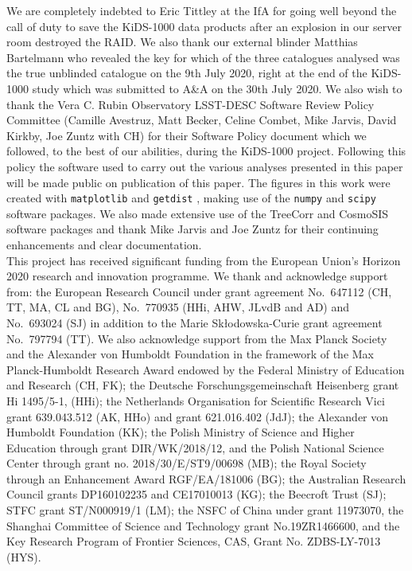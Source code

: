 \documentclass{aa}
\newcommand{\software}[1]{\texttt{#1}}
\begin{document}
\begin{acknowledgements}
We are completely indebted to Eric Tittley at the IfA for going well beyond the call of duty to save the KiDS-1000 data products after an explosion in our server room destroyed the RAID.   We also thank
our external blinder Matthias Bartelmann who revealed the key for which of the three catalogues analysed was the true unblinded catalogue on the 9th July 2020, right at the end of the KiDS-1000 study which was submitted to A\&A on the 30th July 2020.   We also wish to thank the Vera C. Rubin Observatory LSST-DESC Software Review Policy Committee (Camille Avestruz, Matt Becker, Celine Combet, Mike Jarvis, David Kirkby, Joe Zuntz with CH) for their Software Policy document which we followed, to the best of our abilities, during the KiDS-1000 project.   Following this policy the software used to carry out the various analyses presented in this paper will be made public on publication of this paper. 
The figures in this work were created with \software{matplotlib} \citep{Hunter2007} and \software{getdist} \citep{Lewis2019}, making use of the 
\software{numpy} \citep{Oliphant2006} and \software{scipy} \citep{Jones2001} software packages. We also made extensive use of the {\sc TreeCorr} and {\sc CosmoSIS} software packages and thank
Mike Jarvis and Joe Zuntz for their continuing enhancements and clear documentation.\\

This project has received significant funding from the European Union's Horizon 2020 research and innovation programme.  We thank and acknowledge support from: the European Research Council under grant agreement No.~647112 (CH, TT, MA, CL and BG), No.~770935 (HHi, AHW, JLvdB and AD) and No.~693024 (SJ) in addition to the Marie Sk\l{}odowska-Curie grant agreement No.~797794 (TT).   We also acknowledge support from the Max Planck Society and the Alexander von Humboldt Foundation in the framework of the Max Planck-Humboldt Research Award endowed by the Federal Ministry of Education and Research (CH, FK);  the Deutsche Forschungsgemeinschaft Heisenberg grant Hi 1495/5-1, (HHi);  the Netherlands Organisation for Scientific Research Vici grant 639.043.512 (AK, HHo) and grant 621.016.402 (JdJ); the Alexander von Humboldt Foundation (KK);  the Polish Ministry of Science and Higher Education through grant DIR/WK/2018/12, and the Polish National Science Center through grant no. 2018/30/E/ST9/00698 (MB); the Royal Society through an Enhancement Award RGF/EA/181006 (BG);  the Australian Research Council grants DP160102235 and CE17010013 (KG);  the Beecroft Trust (SJ);  STFC grant ST/N000919/1 (LM); 
the NSFC of China under grant 11973070, the Shanghai Committee of Science and Technology grant No.19ZR1466600, and the Key Research Program of Frontier Sciences, CAS, Grant No. ZDBS-LY-7013 (HYS).\\


\end{acknowledgements}
\end{document}
